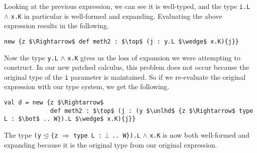 \documentclass{llncs}
\numberwithin{subcase}{casethm}
\numberwithin{casethm}{theorem}
\numberwithin{casethm}{lemma}
\begin{document}
Looking at the previous expression, we can see it is well-typed, 
and the type \texttt{i.L} $\wedge$ \texttt{x.K} in particular is 
well-formed and expanding.
Evaluating the above expression results in the following.
\begin{lstlisting}[mathescape, style=custom_lang]
new {z $\Rightarrow$ def meth2 : $\top$ (j : y.L $\wedge$ x.K){j}}
\end{lstlisting}
Now the type \texttt{y.L} $\wedge$ \texttt{x.K} gives us the loss of 
expansion we were attempting to construct. In our new patched calculus, 
this problem does not occur because the original type of the \texttt{i} 
parameter is maintained. So if we re-evaluate the original expression 
with our type system, we get the following.
\begin{lstlisting}[mathescape, style=custom_lang]
val d = new {z $\Rightarrow$
             def meth2 : $\top$ (j : (y $\unlhd$ {z $\Rightarrow$ type L : $\bot$ .. W}).L $\wedge$ x.K){j}}
\end{lstlisting}
The type \texttt{(y} $\unlhd$ \texttt{\{z} $\Rightarrow$ 
\texttt{type L :} $\bot$ \texttt{.. W\}).L} $\wedge$ \texttt{x.K} is now 
both well-formed and expanding because it is the original type 
from our original expression.



\end{document}
